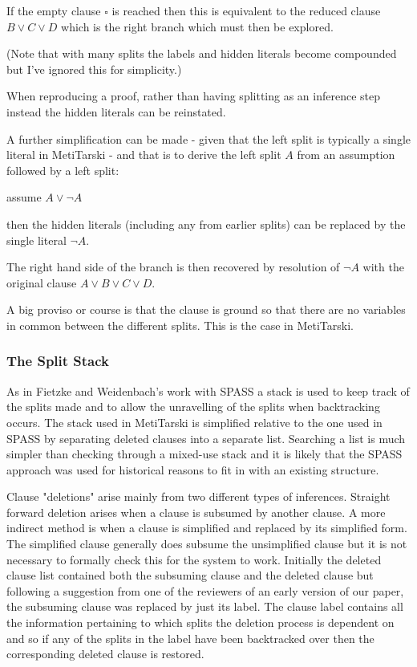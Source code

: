 \documentclass[11pt, oneside]{article}   	%
\begin{document}
If the empty clause $\square$ is reached then this is equivalent to the reduced clause $B \vee C \vee D$ which is the right branch which must then be explored.

(Note that with many splits the labels and hidden literals become compounded but I've ignored this for simplicity.)

When reproducing a proof, rather than having splitting as an inference step instead the hidden literals can be reinstated.

A further simplification can be made - given that the left split is typically a single literal in MetiTarski - and that is to derive the left split $A$ from
an assumption followed by a left split:

assume $A \vee \lnot A$

then the hidden literals (including any from earlier splits) can be replaced by the single literal $\lnot A$.

The right hand side of the branch is then recovered by resolution of $\lnot A$ with the original clause $A \vee B \vee C \vee D$.

A big proviso or course is that the clause is ground so that there are no variables in common between the different splits. This is the case in MetiTarski.

\subsubsection{The Split Stack}

As in Fietzke and Weidenbach's \cite{SPASS_Splitting} work with SPASS a stack is used to keep track of the splits made and to allow the unravelling of the splits when backtracking occurs. The stack
used in MetiTarski is simplified relative to the one used in SPASS by separating deleted clauses into a separate list. Searching a list is much simpler than checking through a mixed-use stack and it is likely
that the SPASS approach was used for historical reasons to fit in with an existing structure.

Clause "deletions" arise mainly from two different types of inferences. Straight forward deletion arises when a clause is subsumed by another clause. A more indirect method is when a clause is simplified
and replaced by its simplified form. The simplified clause generally does subsume the unsimplified clause but it is not necessary to formally check this for the system to work. Initially the deleted clause list
contained both the subsuming clause and the deleted clause but following a suggestion from one of the reviewers of an early version of our paper, the subsuming clause was replaced by just its label.
The clause label contains all the information pertaining to which splits the deletion process is dependent on and so if any of the splits in the label have been backtracked over then the corresponding
deleted clause is restored.
\end{document}
